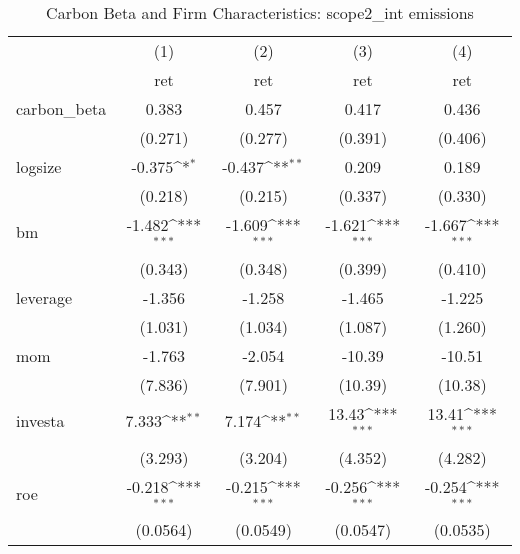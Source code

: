 \begin{table}[htbp]\centering
\def\sym#1{\ifmmode^{#1}\else\(^{#1}\)\fi}
\caption{Carbon Beta and Firm Characteristics: scope2\_int emissions}
\begin{tabular}{l*{4}{c}}
\hline\hline
                    &\multicolumn{1}{c}{(1)}&\multicolumn{1}{c}{(2)}&\multicolumn{1}{c}{(3)}&\multicolumn{1}{c}{(4)}\\
                    &\multicolumn{1}{c}{ret}&\multicolumn{1}{c}{ret}&\multicolumn{1}{c}{ret}&\multicolumn{1}{c}{ret}\\
\hline
carbon\_beta         &       0.383         &       0.457         &       0.417         &       0.436         \\
                    &     (0.271)         &     (0.277)         &     (0.391)         &     (0.406)         \\
[1em]
logsize             &      -0.375\sym{*}  &      -0.437\sym{**} &       0.209         &       0.189         \\
                    &     (0.218)         &     (0.215)         &     (0.337)         &     (0.330)         \\
[1em]
bm                  &      -1.482\sym{***}&      -1.609\sym{***}&      -1.621\sym{***}&      -1.667\sym{***}\\
                    &     (0.343)         &     (0.348)         &     (0.399)         &     (0.410)         \\
[1em]
leverage            &      -1.356         &      -1.258         &      -1.465         &      -1.225         \\
                    &     (1.031)         &     (1.034)         &     (1.087)         &     (1.260)         \\
[1em]
mom                 &      -1.763         &      -2.054         &      -10.39         &      -10.51         \\
                    &     (7.836)         &     (7.901)         &     (10.39)         &     (10.38)         \\
[1em]
investa             &       7.333\sym{**} &       7.174\sym{**} &       13.43\sym{***}&       13.41\sym{***}\\
                    &     (3.293)         &     (3.204)         &     (4.352)         &     (4.282)         \\
[1em]
roe                 &      -0.218\sym{***}&      -0.215\sym{***}&      -0.256\sym{***}&      -0.254\sym{***}\\
                    &    (0.0564)         &    (0.0549)         &    (0.0547)         &    (0.0535)         \\

\end{tabular}
\end{table}
